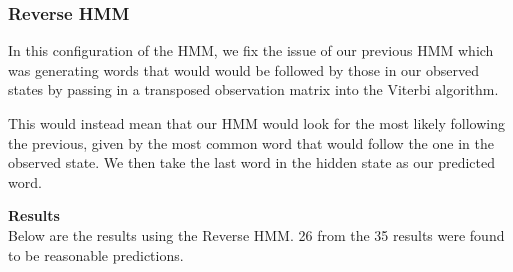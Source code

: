 \documentclass{article}
\begin{document}
\subsubsection{Reverse HMM}
In this configuration of the HMM, we fix the issue of our previous HMM which
was generating words that would would be followed by those in our observed
states by passing in a transposed observation matrix into the Viterbi
algorithm.

This would instead mean that our HMM would look for the most likely following
the previous, given by the most common word that would follow the one in the
observed state. We then take the last word in the hidden state as our predicted
word.

\pagebreak
\textbf{Results}\\
Below are the results using the Reverse HMM. 26 from the 35 results were found
to be reasonable predictions.
\end{document}
